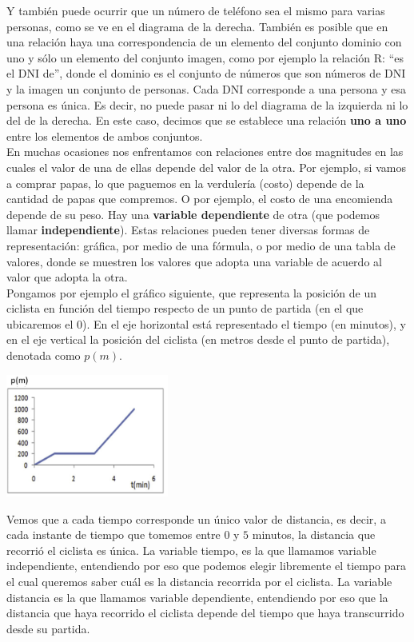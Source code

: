 \documentclass[12pt]{article}
\theoremstyle{definition}
\begin{document}
\begin{enumerate}
Y también puede ocurrir que un número de teléfono sea el mismo para varias personas, como  se ve en el diagrama de la derecha. También es posible que en una relación haya una correspondencia de un elemento del conjunto dominio con uno y sólo un elemento del conjunto imagen, como por ejemplo la relación R: “es el DNI de”, donde el dominio es el conjunto de números que son números de DNI y la imagen un conjunto de personas. Cada DNI corresponde a una persona y esa persona es única. Es decir, no puede pasar ni lo del diagrama de la izquierda ni lo del de la derecha. En este caso, decimos que se establece una relación \textbf{uno a uno} entre los elementos de ambos conjuntos. \\

En muchas ocasiones nos enfrentamos con relaciones entre dos magnitudes en las cuales el valor de una de ellas depende del valor de la otra. Por ejemplo, si vamos a comprar papas, lo que paguemos en la verdulería (costo) depende de la cantidad de papas que compremos.  O por ejemplo, el costo de una encomienda depende de su peso. Hay una \textbf{variable dependiente} de otra (que podemos llamar \textbf{independiente}). Estas relaciones pueden tener diversas formas de representación: gráfica, por medio de una fórmula, o por medio de una tabla de valores, donde se muestren los valores que adopta una variable de acuerdo al valor que adopta la otra.\\

Pongamos por ejemplo el gráfico siguiente, que representa la posición de un ciclista en función del tiempo respecto de un punto de partida (en el que ubicaremos el 0). En el eje horizontal está representado el tiempo (en minutos), y en el eje vertical la posición del ciclista (en metros desde el punto de partida), denotada como $p(m)$. 
\begin{center} 
\includegraphics[width=0.4\textwidth]{tp2_fig5.jpg} 
\end{center}
Vemos que a cada tiempo corresponde un único valor de distancia, es decir, a cada instante de tiempo que tomemos entre $0$ y $5$ minutos, la distancia que recorrió el ciclista es única. La variable tiempo, es la que llamamos variable independiente, entendiendo por eso que podemos elegir libremente el tiempo para el cual queremos saber cuál es la distancia recorrida por el ciclista. La variable distancia es la que llamamos variable dependiente, entendiendo por eso que la distancia que haya recorrido el ciclista depende del tiempo que haya transcurrido desde su partida.\\ 


\end{enumerate}
\end{document}
